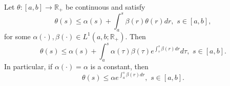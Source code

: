     \begin{proposition}\label{prop:GI}
        Let $\theta:[a,b]\to \mathbb{R}_{+}$ be continuous and satisfy
    	$$
    	    \theta (s)\leq \alpha(s)+\int_a^s\beta(r)\theta (r) dr,\,\, s \in [a,b],
    	$$
    	for some $\alpha(\cdot),\beta (\cdot)\in L^1(a,b;\mathbb{R}_{+})$. Then
    	\begin{equation}\label{eq1.30}
    	    \theta(s)\leq \alpha(s)+\int_{a}^{s}\alpha(\tau)\beta(\tau)e^{\int_{\tau}^{s}%
    	        \beta(r)dr}d\tau,\,\, s\in[a,b].
    	\end{equation}
    	In particular, if $\alpha(\cdot)=\alpha$ is a constant, then
    	\begin{equation}\label{eq1.31}
    	    \theta(s) \leq \alpha e^{\int_{a}^{s}\beta(r)dr}, \,\, s \in [a,b]. 
    	\end{equation}
    \end{proposition}
